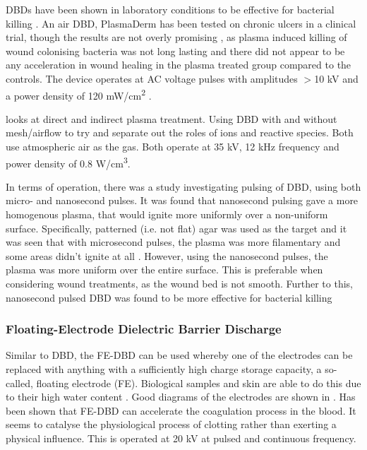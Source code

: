 \documentclass[11pt, oneside]{article}   	%
\begin{document}
DBDs have been shown in laboratory conditions to be effective for bacterial killing \cite{Daeschlein2012in, Fridman2006blood}.
An air DBD, PlasmaDerm has been tested on chronic ulcers in a clinical trial, though the results are not overly promising \cite{Brehmer2015alleviation}, as plasma induced killing of wound colonising bacteria was not long lasting and there did not appear to be any acceleration in wound healing in the plasma treated group compared to the controls.
The device operates at AC voltage pulses with amplitudes $>$10 kV and a power density of 120 mW/cm\textsuperscript{2} \cite{Brehmer2015alleviation}.



\cite{Fridman2007comparison} looks at direct and indirect plasma treatment. Using DBD with and without mesh/airflow to try and separate out the roles of ions and reactive species.
Both use atmospheric air as the gas.
Both operate at 35 kV, 12 kHz frequency and power density of 0.8 W/cm\textsuperscript{3}.

In terms of operation, there was a study investigating pulsing of DBD, using both micro- and nanosecond pulses. 
It was found that nanosecond pulsing gave a more homogenous plasma, that would ignite more uniformly over a non-uniform surface.
Specifically, patterned (i.e. not flat) agar was used as the target and it was seen that with microsecond pulses, the plasma was more filamentary and some areas didn't ignite at all \cite{Ayan2009application}. 
However, using the nanosecond pulses, the plasma was more uniform over the entire surface.
This is preferable when considering wound treatments, as the wound bed is not smooth.
Further to this, nanosecond pulsed DBD was found to be more effective for bacterial killing \cite{Ayan2008nanosecond}


\subsubsection{Floating-Electrode Dielectric Barrier Discharge}
Similar to DBD, the FE-DBD can be used whereby one of the electrodes can be replaced with anything with a sufficiently high charge storage capacity, a so-called, floating electrode (FE). 
Biological samples and skin are able to do this due to their high water content {\cite{Fridman2006blood}}.
Good diagrams of the electrodes are shown in {\cite{Fridman2006blood}}.
Has been shown that FE-DBD can accelerate the coagulation process in the blood. It seems to catalyse the physiological process of clotting rather than exerting a physical influence.
This is operated at 20 kV at pulsed and continuous frequency.
\end{document}
